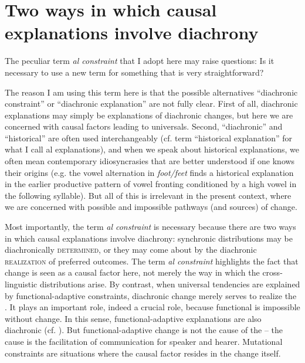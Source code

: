 \documentclass[output=paper]{langsci/langscibook}
\begin{document}
\section{Two ways in which causal explanations involve diachrony}\label{sec:haspelmath:3}

The peculiar term \textit{al constraint} that I adopt here may raise questions: Is it necessary to use a new term for something that is very straightforward? 

The reason I am using this term here is that the possible alternatives “diachronic constraint” or “diachronic explanation” are not fully clear. First of all, diachronic explanations may simply be explanations of diachronic changes, but here we are concerned with causal factors leading to universals. Second, “diachronic” and “historical” are often used interchangeably (cf.  term “historical explanation” for what I call al explanations), and when we speak about historical explanations, we often mean contemporary idiosyncrasies that are better understood if one knows their origins (e.g. the vowel alternation in \textit{foot/feet} finds a historical explanation in the earlier productive pattern of vowel fronting conditioned by a high vowel in the following syllable). But all of this is irrelevant in the present context, where we are concerned with possible and impossible pathways (and sources) of change.

Most importantly, the term \textit{al constraint} is necessary because there are two ways in which causal explanations involve diachrony: synchronic distributions may be diachronically \textsc{determined}, or they may come about by the diachronic \textsc{realization} of preferred outcomes. The term \textit{al constraint} highlights the fact that change is seen as a causal factor here, not merely the way in which the cross-linguistic distributions arise. By contrast, when universal tendencies are explained by functional-adaptive constraints, diachronic change merely serves to realize the .\label{p:haspelmath:merelyserve} 
It plays an important role, indeed a crucial role, because functional  is impossible without change. In this sense, functional-adaptive explanations are also diachronic (cf. \citealt{Haspelmath1999_Opt}). But functional-adaptive change is not the cause of the  – the cause is the facilitation of communication for speaker and hearer. Mutational constraints are situations where the causal factor resides in the change itself.
\end{document}

